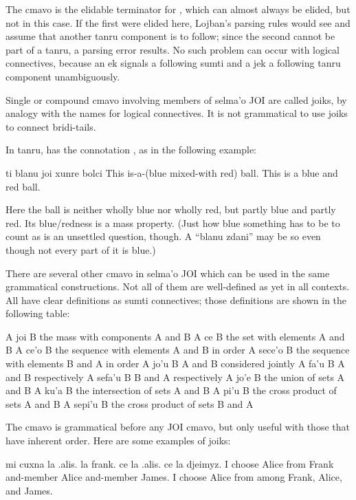 The cmavo  is the elidable terminator for ,
    which can almost always be elided, but not in this case. If the
    first  were elided here, Lojban's parsing rules would see
     and assume that another tanru component is to
    follow; since the second  cannot be part of a tanru, a
    parsing error results. No such problem can occur with logical
    connectives, because an ek signals a following sumti and a jek
    a following tanru component unambiguously.

Single or compound cmavo involving members of selma'o JOI
    are called joiks, by analogy with the names for logical
    connectives. It is not grammatical to use joiks to connect
    bridi-tails.

In tanru,  has the connotation , as in
    the following example:
\begin{example}
ti blanu joi xunre bolci\n
This is-a-(blue mixed-with red) ball.\n
This is a blue and red ball.
\end{example}

Here the ball is neither wholly blue nor wholly red, but
    partly blue and partly red. Its blue/redness is a mass
    property. (Just how blue something has to be to count as
     is an unsettled question, though. A ``blanu
    zdani'' may be so even though not every part of it is
    blue.)

There are several other cmavo in selma'o JOI which can be
    used in the same grammatical constructions. Not all of them are
    well-defined as yet in all contexts. All have clear definitions
    as sumti connectives; those definitions are shown in the
    following table:

   A joi B     the mass with components A and B
    A ce B      the set with elements A and B
    A ce'o B    the sequence with elements A and B in order
    A sece'o B  the sequence with elements B and A in order
    A jo'u B    A and B considered jointly
    A fa'u B    A and B respectively
    A sefa'u B  B and A respectively
    A jo'e B    the union of sets A and B
    A ku'a B    the intersection of sets A and B
    A pi'u B    the cross product of sets A and B
    A sepi'u B  the cross product of sets B and A

The cmavo  is grammatical before any JOI cmavo, but only
    useful with those that have inherent order. Here are some
    examples of joiks:
\begin{example}
mi cuxna la .alis. la frank.\n
\T	ce la .alis. ce la djeimyz.\n
I choose Alice from Frank\n
\T	and-member Alice and-member James.\n
I choose Alice from among Frank, Alice, and James.
\end{example}

